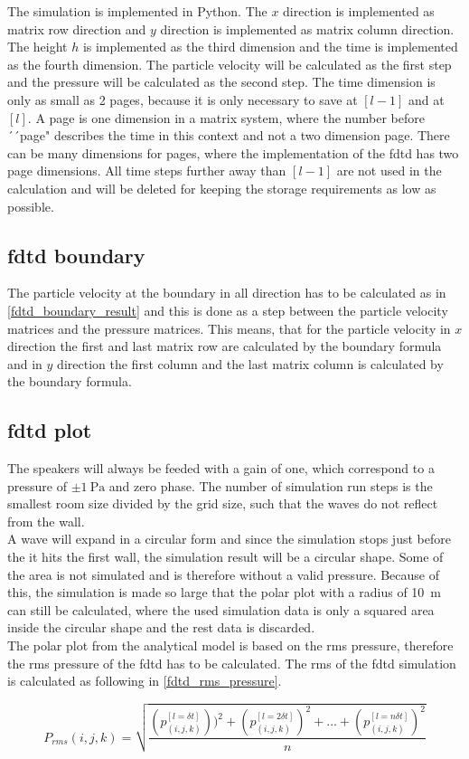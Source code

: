 The simulation is implemented in Python. The $x$ direction is implemented as matrix row direction and $y$ direction is implemented as matrix column direction. The height $h$ is implemented as the third dimension and the time is implemented as the fourth dimension. The particle velocity will be calculated as the first step and the pressure will be calculated as the second step. The time dimension is only as small as 2 pages, because it is only necessary to save at $[l-1]$ and at $[l]$. A page is one dimension in a matrix system, where the number before ´´page"  describes the time in this context and not a two dimension page. There can be many dimensions for pages, where the implementation of the \gls{fdtd} has two page dimensions.  All time steps further away than $[l-1]$ are not used in the calculation and will be deleted for keeping the storage requirements as low as possible. 

\subsection{\gls{fdtd} boundary}
The particle velocity at the boundary in all direction has to be calculated as in \autoref{fdtd_boundary_result} and this is done as a step between the particle velocity matrices and the pressure matrices. This means, that for the particle velocity in $x$ direction the first and last matrix row are calculated by the boundary formula and in $y$ direction the first column and the last matrix column is calculated by the boundary formula. 


\subsection{\gls{fdtd} plot}
The speakers will always be feeded with a gain of one, which correspond to a pressure of $\pm \SI{1}{\pascal}$ and zero phase. The number of simulation run steps is the smallest room size divided by the grid size, such that the waves do not reflect from the wall. \\

A wave will expand in a circular form and since the simulation stops just before the it hits the first wall, the simulation result will be a circular shape. Some of the area is not simulated and is therefore without a valid pressure. Because of this, the simulation is made so large that the polar plot with a radius of \SI{10}{\meter} can still be calculated, where the used simulation data is only a squared area inside the circular shape and the rest data is discarded.\\

The polar plot from the analytical model is based on the \gls{rms} pressure, therefore the \gls{rms} pressure of the \gls{fdtd} has to be calculated. The \gls{rms} of the \gls{fdtd} simulation is calculated as following in \autoref{fdtd_rms_pressure}.

\begin{equation}\label{fdtd_rms_pressure}
P_{rms}(i,j,k)=\sqrt{\frac{\left(p_{(i,j,k)}^{[l= \delta t]} \right))^2 + \left(p_{(i,j,k)}^{[l= 2\delta t]}\right)^2 +...+\left(p_{(i,j,k)}^{[l= n\delta t]}\right)^2}{n}}
\end{equation}



